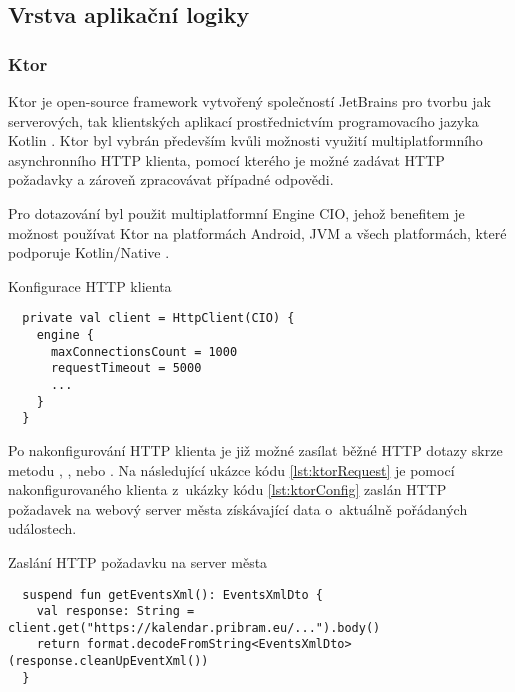 \subsection{Vrstva aplikační logiky}

\subsubsection*{Ktor}
Ktor je open-source framework vytvořený společností JetBrains pro tvorbu jak serverových, tak klientských aplikací prostřednictvím programovacího 
jazyka Kotlin \cite{ktor}. Ktor byl vybrán především kvůli možnosti využití multiplatformního asynchronního HTTP klienta, pomocí kterého je možné zadávat 
HTTP požadavky a zároveň zpracovávat případné odpovědi. 

Pro dotazování byl použit multiplatformní Engine CIO, jehož benefitem je možnost používat Ktor na platformách Android, JVM a všech platformách, které podporuje Kotlin/Native \cite{ktorCIO}.
\begin{listing}[H]
\caption{Konfigurace HTTP klienta}\label{lst:ktorConfig}
\begin{verbatim}
  private val client = HttpClient(CIO) {
    engine {
      maxConnectionsCount = 1000
      requestTimeout = 5000
      ...
    }
  }
\end{verbatim}
\end{listing}

Po nakonfigurování HTTP klienta je již možné zasílat běžné HTTP dotazy skrze metodu , ,  nebo .
Na následující ukázce kódu \ref{lst:ktorRequest} je pomocí nakonfigurovaného klienta z~ukázky kódu \ref{lst:ktorConfig} zaslán HTTP požadavek
na webový server města získávající data o~aktuálně pořádaných událostech.

\begin{listing}[H]
\caption{Zaslání HTTP požadavku na server města}\label{lst:ktorRequest}
\begin{verbatim}
  suspend fun getEventsXml(): EventsXmlDto {
    val response: String = client.get("https://kalendar.pribram.eu/...").body()
    return format.decodeFromString<EventsXmlDto>(response.cleanUpEventXml())
  }
\end{verbatim}
\end{listing}

